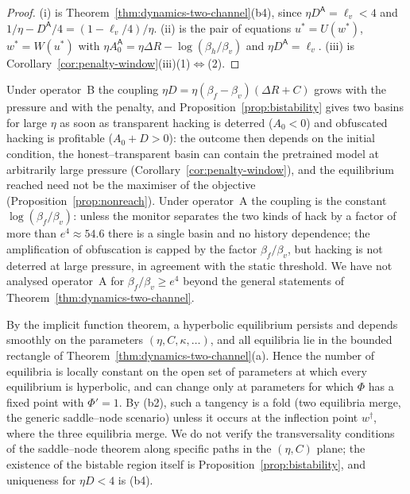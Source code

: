 \begin{proof}
(i) is Theorem~\ref{thm:dynamics-two-channel}(b4), since
$\eta D^{\mathsf A}=\ell_v<4$ and
$1/\eta-D^{\mathsf A}/4=(1-\ell_v/4)/\eta$. (ii) is the pair of equations
$u^\ast=U(w^\ast)$, $w^\ast=W(u^\ast)$ with
$\eta A_0^{\mathsf A}=\eta\Delta R-\log(\beta_h/\beta_v)$ and
$\eta D^{\mathsf A}=\ell_v$. (iii) is
Corollary~\ref{cor:penalty-window}(iii)(1)$\Leftrightarrow$(2).
\end{proof}

\begin{remark}\label{rem:A-vs-B}
Under operator~B the coupling $\eta D=\eta(\beta_f-\beta_v)(\Delta R+C)$
grows with the pressure and with the penalty, and
Proposition~\ref{prop:bistability} gives two basins for large $\eta$ as
soon as transparent hacking is deterred ($A_0<0$) and obfuscated hacking
is profitable ($A_0+D>0$): the outcome then depends on the initial
condition, the honest--transparent basin can contain the pretrained model
at arbitrarily large pressure
(Corollary~\ref{cor:penalty-window}), and the equilibrium reached need not
be the maximiser of the objective (Proposition~\ref{prop:nonreach}). Under
operator~A the coupling is the constant $\log(\beta_f/\beta_v)$: unless
the monitor separates the two kinds of hack by a factor of more than
$e^4\approx54.6$ there is a single basin and no history dependence; the
amplification of obfuscation is capped by the factor $\beta_f/\beta_v$,
but hacking is not deterred at large pressure, in agreement with the
static threshold. We have not analysed operator~A for
$\beta_f/\beta_v\ge e^4$ beyond the general statements of
Theorem~\ref{thm:dynamics-two-channel}.
\end{remark}

\begin{remark}[Bifurcations]\label{rem:saddle-node}
By the implicit function theorem, a hyperbolic equilibrium persists and
depends smoothly on the parameters $(\eta,C,\kappa,\dots)$, and all
equilibria lie in the bounded rectangle of
Theorem~\ref{thm:dynamics-two-channel}(a). Hence the number of equilibria
is locally constant on the open set of parameters at which every
equilibrium is hyperbolic, and can change only at parameters for which
$\Phi$ has a fixed point with $\Phi'=1$. By (b2), such a tangency is a fold
(two equilibria merge, the generic saddle--node scenario) unless it occurs
at the inflection point $w^\dagger$, where the three equilibria merge. We
do not verify the transversality conditions of the saddle--node theorem
along specific paths in the $(\eta,C)$ plane; the existence of the
bistable region itself is Proposition~\ref{prop:bistability}, and
uniqueness for $\eta D<4$ is (b4).
\end{remark}


